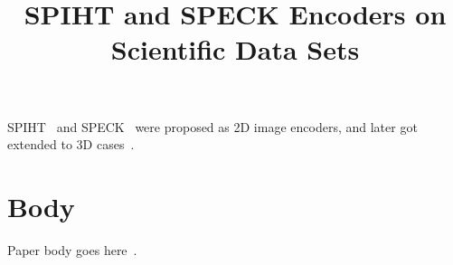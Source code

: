 \documentclass[review]{vgtc}                 %
\title{SPIHT and SPECK Encoders on Scientific Data Sets}
\begin{document}

\maketitle

\label{sec:intro}
%
SPIHT~\cite{} and SPECK~\cite{} were proposed as 2D image encoders,
and later got extended to 3D cases~\cite{}. 

\section{Body}
%
Paper body goes here~\cite{clyne2007interactive}.



\end{document}
